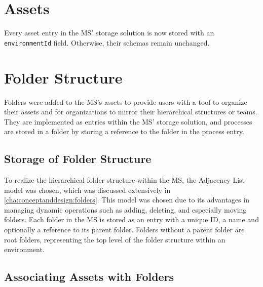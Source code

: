 %

\section{Assets}

Every asset entry in the MS' storage solution is now stored with an
\lstinline{environmentId} field.
Otherwise, their schemas remain unchanged.


\section{Folder Structure}

Folders were added to the MS's assets to provide users with a tool to organize their assets and
for organizations to mirror their hierarchical structures or teams.
They are implemented as entries within the MS' storage solution,
and processes are stored in a folder by storing a reference to the folder in the process entry.

\subsection{Storage of Folder Structure}

To realize the hierarchical folder structure within the MS,
the Adjacency List model was chosen,
which was discussed extensively in \ref{cha:conceptanddesign:folders}.
This model was chosen due to its advantages in managing dynamic operations such as 
adding, deleting, and especially moving folders.
Each folder in the MS is stored as an entry with a unique ID, a name and optionally a reference to
its parent folder.
Folders without a parent folder are root folders, representing the top level of the folder
structure within an environment.

\subsection{Associating Assets with Folders}


